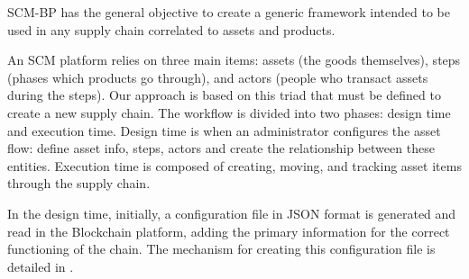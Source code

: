 \label{chap:Technical}

\acresetall 

\ac{SCM-BP} has the general objective to create a generic framework intended to be used in any supply chain correlated to assets and products. 

An SCM platform relies on three main items: assets (the goods themselves), steps (phases which products go through), and actors (people who transact assets during the steps). Our approach is based on this triad that must be defined to create a new supply chain. The workflow is divided into two phases: design time and execution time. Design time is when an administrator configures the asset flow: define asset info, steps, actors and create the relationship between these entities. Execution time is composed of creating, moving, and tracking asset items through the supply chain.

In the design time, initially, a configuration file in JSON format is generated and read in the Blockchain platform, adding the primary information for the correct functioning of the chain. The mechanism for creating this configuration file is detailed in .





%

%
%